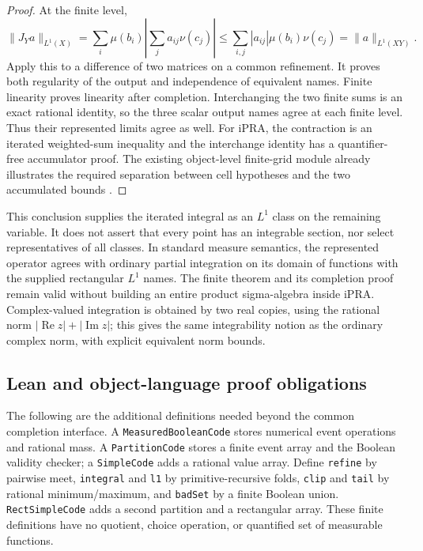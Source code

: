 \begin{proof}
At the finite level,
\[
 \|J_Ya\|_{L^1(X)}
 =\sum_i\mu(b_i)\left|\sum_j a_{ij}\nu(c_j)\right|
 \leq\sum_{i,j}|a_{ij}|\mu(b_i)\nu(c_j)
 =\|a\|_{L^1(XY)}.
\]
Apply this to a difference of two matrices on a common refinement.  It proves
both regularity of the output and independence of equivalent names.
Finite linearity proves linearity after completion.  Interchanging the two
finite sums is an exact rational identity, so the three scalar output names
agree at each finite level.  Thus their represented limits agree as well.
For iPRA, the contraction is an iterated weighted-sum inequality and the
interchange identity has a quantifier-free accumulator proof.  The existing
object-level finite-grid module already illustrates the required separation
between cell hypotheses and the two accumulated bounds \cite{repoGridIntegral}.
\end{proof}

This conclusion supplies the iterated integral as an \(L^1\) class on the
remaining variable.  It does not assert that every point has an integrable
section, nor select representatives of all classes.  In standard measure
semantics, the represented operator agrees with ordinary partial integration
on its domain of functions with the supplied rectangular \(L^1\) names.
The finite theorem and its completion proof remain valid without building
an entire product sigma-algebra inside iPRA.  Complex-valued integration is
obtained by two real copies, using the rational norm
\(|\operatorname{Re}z|+|\operatorname{Im}z|\); this gives the same
integrability notion as the ordinary complex norm, with explicit equivalent
norm bounds.

\subsection{Lean and object-language proof obligations}

The following are the additional definitions needed beyond the common
completion interface.  A \texttt{MeasuredBooleanCode} stores numerical
event operations and rational mass.  A \texttt{PartitionCode} stores a
finite event array and the Boolean validity checker; a
\texttt{SimpleCode} adds a rational value array.  Define
\texttt{refine} by pairwise meet, \texttt{integral} and \texttt{l1} by
primitive-recursive folds, \texttt{clip} and \texttt{tail} by rational
minimum/maximum, and \texttt{badSet} by a finite Boolean union.
\texttt{RectSimpleCode} adds a second partition and a rectangular array.
These finite definitions have no quotient, choice operation, or quantified
set of measurable functions.


